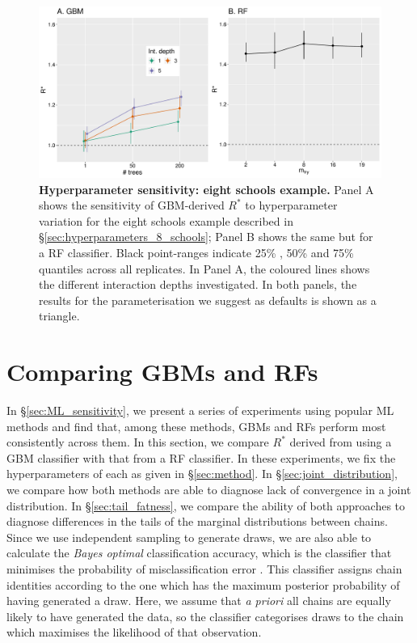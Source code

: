 \documentclass[ba]{imsart}
\numberwithin{equation}{section}
\theoremstyle{plain}
\begin{document}
\begin{supplement}
		\begin{figure}[!htb]
			\centerline{\includegraphics[width=1.0\textwidth]{hypers_8_schools.pdf}}
			\caption{\textbf{Hyperparameter sensitivity: eight schools example.} Panel A shows the sensitivity of GBM-derived $R^*$ to hyperparameter variation for the eight schools example described in \S\ref{sec:hyperparameters_8_schools}; Panel B shows the same but for a RF classifier. Black point-ranges indicate 25\% , 50\% and 75\% quantiles across all replicates. In Panel A, the coloured lines shows the different interaction depths investigated. In both panels, the results for the parameterisation we suggest as defaults is shown as a triangle.}
			\label{fig:hypers_8_schools}
		\end{figure}
		
		\section{Comparing GBMs and RFs}\label{sec:comparison_gbm_rf}
		In \S\ref{sec:ML_sensitivity}, we present a series of experiments using popular ML methods and find that, among these methods, GBMs and RFs perform most consistently across them. In this section, we compare $R^*$ derived from using a GBM classifier with that from a RF classifier. In these experiments, we fix the hyperparameters of each as given in \S\ref{sec:method}. In \S\ref{sec:joint_distribution}, we compare how both methods are able to diagnose lack of convergence in a joint distribution. In \S\ref{sec:tail_fatness}, we compare the ability of both approaches to diagnose differences in the tails of the marginal distributions between chains. Since we use independent sampling to generate draws, we are also able to calculate the \textit{Bayes optimal} classification accuracy, which is the classifier that minimises the probability of misclassification error \citep{devroye2013probabilistic}. This classifier assigns chain identities according to the one which has the maximum posterior probability of having generated a draw. Here, we assume that \textit{a priori} all chains are equally likely to have generated the data, so the classifier categorises draws to the chain which maximises the likelihood of that observation.
		

\end{supplement}
\end{document}
